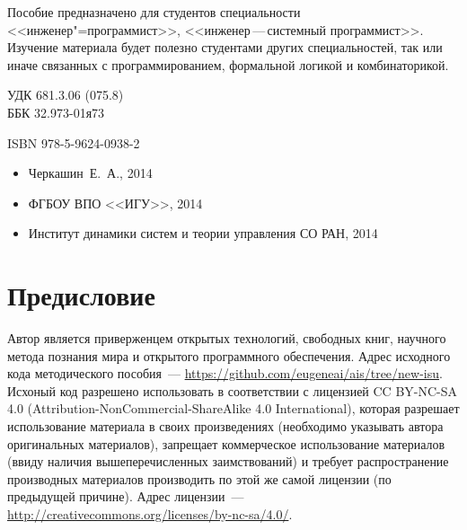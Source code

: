 \documentclass[12pt, openany, twoside, final]{extbook} %
\begin{document}
\begin{mygroup}
\begin{minipage}[t]{0.95\linewidth}
    Пособие предназначено для студентов специальности <<инженер"=программист>>, <<инженер\,---\,системный программист>>. Изучение материала будет полезно студентами других специальностей, так или иначе связанных с программированием, формальной логикой и комбинаторикой.

\mbox{}
\endgroup
\end{minipage}
\mbox{}\hspace{0.7\linewidth}
\begin{minipage}{0.3\linewidth}\small
\noindent УДК 681.3.06 (075.8)\\
\noindent ББК 32.973-01я73
\end{minipage}

\vfill
\noindent\begin{minipage}[t]{0.35\linewidth}\small
\noindent ISBN 978-5-9624-0938-2
\end{minipage}%
\begin{minipage}[t]{0.65\linewidth}\small
\begin{itemize}
\setlength{\itemsep}{-0.5ex}
\setlength{\parsep}{0pt}
\item[\copyright{}] Черкашин~Е.~А., 2014
\item[\copyright{}] ФГБОУ ВПО <<ИГУ>>, 2014
\item[\copyright{}] Институт динамики систем и теории управления СО РАН, 2014
\end{itemize}
\end{minipage}
\end{mygroup}
\clearpage
\tableofcontents
\clearpage

\newpage
\chapter*{Предисловие}



Автор является приверженцем открытых технологий, свободных книг, научного метода познания мира и открытого программного обеспечения. Адрес исходного кода методического пособия~--- \url{https://github.com/eugeneai/ais/tree/new-isu}. Исхоный код разрешено использовать в соответствии с лицензией  \foreignlanguage{english}{CC BY-NC-SA 4.0 (Attribution-NonCommercial-ShareAlike 4.0 International)}, которая разрешает использование материала в своих произведениях (необходимо указывать автора оригинальных материалов), запрещает коммерческое использование материалов (ввиду наличия вышеперечисленных заимствований) и требует распространение производных материалов производить по этой же самой лицензии (по предыдущей причине). Адрес лицензии~---  \url{http://creativecommons.org/licenses/by-nc-sa/4.0/}.
\end{document}
